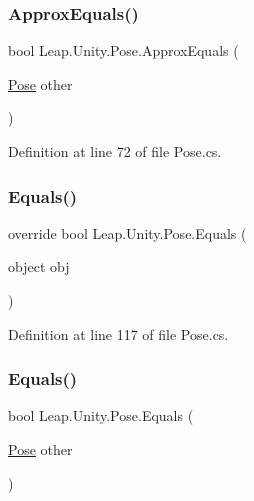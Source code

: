 \subsubsection{\texorpdfstring{ApproxEquals()}{ApproxEquals()}}
{\footnotesize\ttfamily bool Leap.\+Unity.\+Pose.\+Approx\+Equals (\begin{DoxyParamCaption}\item[{\mbox{\hyperlink{struct_leap_1_1_unity_1_1_pose}{Pose}}}]{other }\end{DoxyParamCaption})}



Definition at line 72 of file Pose.\+cs.

\mbox{\label{struct_leap_1_1_unity_1_1_pose_ac1e5f3546934ffb7f8935240403eb382}} 
\subsubsection{\texorpdfstring{Equals()}{Equals()}\hspace{0.1cm}{\footnotesize\ttfamily [1/2]}}
{\footnotesize\ttfamily override bool Leap.\+Unity.\+Pose.\+Equals (\begin{DoxyParamCaption}\item[{object}]{obj }\end{DoxyParamCaption})}



Definition at line 117 of file Pose.\+cs.

\mbox{\label{struct_leap_1_1_unity_1_1_pose_a8482a9c3754c412fd00ed41511343a12}} 
\subsubsection{\texorpdfstring{Equals()}{Equals()}\hspace{0.1cm}{\footnotesize\ttfamily [2/2]}}
{\footnotesize\ttfamily bool Leap.\+Unity.\+Pose.\+Equals (\begin{DoxyParamCaption}\item[{\mbox{\hyperlink{struct_leap_1_1_unity_1_1_pose}{Pose}}}]{other }\end{DoxyParamCaption})}



